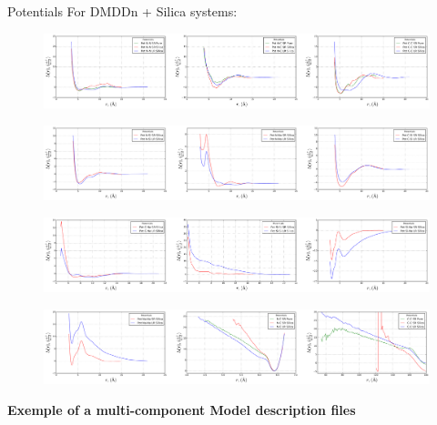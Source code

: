 \documentclass[10pt,a4paper,twoside]{article}
\begin{document}
Potentials For DMDDn + Silica systems:
\begin{figure}[H]
  \begin{center}
	\includegraphics[width=1 \textwidth]{./graphs/Sipots1}
  \end{center}
\end{figure}
\begin{figure}[H]
  \begin{center}
	\includegraphics[width=1 \textwidth]{./graphs/Sipots2}
  \end{center}
\end{figure}
\begin{figure}[H]
  \begin{center}
	\includegraphics[width=1 \textwidth]{./graphs/Sipots3}
  \end{center}
\end{figure}
\begin{figure}[H]
  \begin{center}
	\includegraphics[width=1 \textwidth]{./graphs/Sipots4}
  \end{center}
\end{figure}


\textbf{Exemple of a multi-component Model description files}
\end{document}
